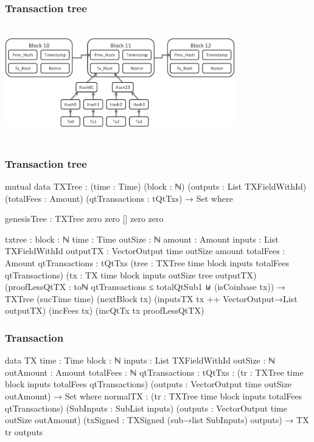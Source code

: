 \documentclass{beamer}
\begin{document}
\begin{frame}
  \frametitle{Transaction tree}
    \includegraphics[width=10cm, height=5cm]{blockchain}
\end{frame}

\begin{frame}
  \frametitle{Transaction tree}
\begin{code}

      mutual
        data TXTree : (time : Time) (block : ℕ)
          (outputs : List TXFieldWithId)
          (totalFees : Amount)
          (qtTransactions : tQtTxs) → Set where

          genesisTree : TXTree zero zero [] zero zero

\end{code}
\end{frame}
\begin{frame}
\begin{code}

          txtree      :
            {block : ℕ} {time : Time}
            {outSize : ℕ} {amount : Amount}
            {inputs : List TXFieldWithId}
            {outputTX : VectorOutput time outSize amount}
            {totalFees : Amount} {qtTransactions : tQtTxs}
            (tree : TXTree time block inputs totalFees qtTransactions)
            (tx : TX {time} {block} {inputs} {outSize} tree outputTX)
            (proofLessQtTX :
                toℕ qtTransactions ≤ totalQtSub1
                ⊎
                (isCoinbase tx))
            → TXTree (sucTime time)
              (nextBlock tx)
              (inputsTX tx ++ VectorOutput→List outputTX)
              (incFees tx) (incQtTx tx proofLessQtTX)

\end{code}
\end{frame}
\begin{frame}
  \frametitle{Transaction}
\begin{code}

        data TX {time : Time} {block : ℕ}
            {inputs : List TXFieldWithId} {outSize : ℕ}
            {outAmount : Amount} {totalFees : ℕ}
            {qtTransactions : tQtTxs}
          : (tr : TXTree time block inputs totalFees qtTransactions)
            (outputs : VectorOutput time outSize outAmount)
            → Set where
          normalTX :
            (tr : TXTree time block inputs totalFees qtTransactions)
            (SubInputs : SubList inputs)
            (outputs : VectorOutput time outSize outAmount)
            (txSigned : TXSigned (sub→list SubInputs) outputs)
            → TX tr outputs

\end{code}
\end{frame}
\end{document}
